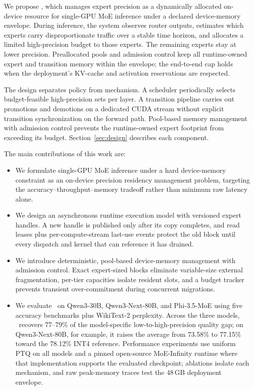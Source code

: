 We propose \systemname, which manages expert precision as a dynamically allocated on-device resource for single-GPU MoE inference under a declared device-memory envelope. During inference, the system observes router outputs, estimates which experts carry disproportionate traffic over a stable time horizon, and allocates a limited high-precision budget to those experts. The remaining experts stay at lower precision. Preallocated pools and admission control keep all runtime-owned expert and transition memory within the envelope; the end-to-end cap holds when the deployment's KV-cache and activation reservations are respected.

The design separates policy from mechanism. A scheduler periodically selects budget-feasible high-precision sets per layer. A transition pipeline carries out promotions and demotions on a dedicated CUDA stream without explicit transition synchronization on the forward path. Pool-based memory management with admission control prevents the runtime-owned expert footprint from exceeding its budget. Section~\ref{sec:design} describes each component.

The main contributions of this work are:
\begin{itemize}[leftmargin=1.5em, itemsep=1pt, topsep=2pt]
  \item We formulate single-GPU MoE inference under a hard device-memory constraint as an on-device precision residency management problem, targeting the accuracy--throughput--memory tradeoff rather than minimum raw latency alone.
  \item We design an asynchronous runtime execution model with versioned expert handles. A new handle is published only after its copy completes, and read leases plus per-compute-stream last-use events protect the old block until every dispatch and kernel that can reference it has drained.
  \item We introduce deterministic, pool-based device-memory management with admission control. Exact expert-sized blocks eliminate variable-size external fragmentation, per-tier capacities isolate resident slots, and a budget tracker prevents transient over-commitment during concurrent migrations.
  \item We evaluate \systemname\ on Qwen3-30B, Qwen3-Next-80B, and Phi-3.5-MoE using five accuracy benchmarks plus WikiText-2 perplexity. Across the three models, \systemname\ recovers 77--79\% of the model-specific low-to-high-precision quality gap; on Qwen3-Next-80B, for example, it raises the average from 73.58\% to 77.15\% toward the 78.12\% INT4 reference. Performance experiments use uniform PTQ on all models and a pinned open-source MoE-Infinity runtime where that implementation supports the evaluated checkpoint; ablations isolate each mechanism, and raw peak-memory traces test the 48\,GB deployment envelope.
\end{itemize}
